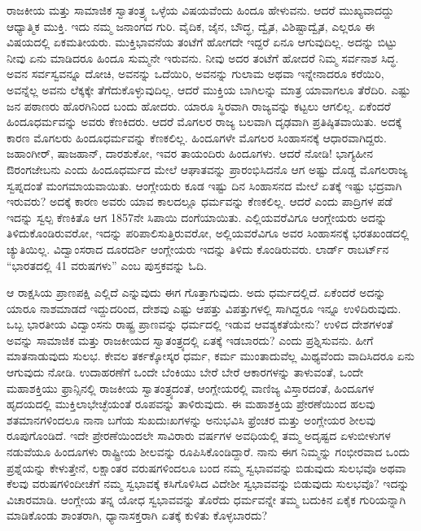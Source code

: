ರಾಜಕೀಯ ಮತ್ತು ಸಾಮಾಜಿಕ ಸ್ವಾತಂತ್ರ್ಯ ಒಳ್ಳೆಯ ವಿಷಯವೆಂದು ಹಿಂದೂ ಹೇಳುವನು. ಆದರೆ ಮುಖ್ಯವಾದದ್ದು ಆಧ್ಯಾತ್ಮಿಕ ಮುಕ್ತಿ. ಇದು ನಮ್ಮ ಜನಾಂಗದ ಗುರಿ. ವೈದಿಕ, ಜೈನ, ಬೌದ್ಧ, ದ್ವೈತ, ವಿಶಿಷ್ಟಾದ್ವೈತ, ಎಲ್ಲರೂ ಈ ವಿಷಯದಲ್ಲಿ ಏಕಮತೀಯರು.\- ಮುಕ್ತಿಭಾವನೆಯ ತಂಟೆಗೆ ಹೋಗದೇ ಇದ್ದರೆ ಏನೂ ಆಗುವುದಿಲ್ಲ. ಅದನ್ನು ಬಿಟ್ಟು ನೀವು ಏನು ಮಾಡಿದರೂ ಹಿಂದೂ ಸುಮ್ಮನೇ ಇರುವನು. ನೀವು ಅದರ ತಂಟೆಗೆ ಹೋದರೆ ನಿಮ್ಮ ಸರ್ವನಾಶ ಸಿದ್ಧ. ಅವನ ಸರ್ವಸ್ವವನ್ನೂ ದೋಚಿ, ಅವನನ್ನು ಒದೆಯಿರಿ, ಅವನನ್ನು ಗುಲಾಮ ಅಥವಾ ಇನ್ನೇನಾದರೂ ಕರೆಯಿರಿ, ಅವನ್ನೆಲ್ಲ ಅವನು ಲೆಕ್ಕಕ್ಕೇ ತೆಗೆದುಕೊಳ್ಳುವುದಿಲ್ಲ. ಆದರೆ ಮುಕ್ತಿಯ ಬಾಗಿಲನ್ನು ಮಾತ್ರ ಯಾವಾಗಲೂ ತೆರೆದಿರಿ. ಎಷ್ಟು ಜನ ಪಠಾಣರು ಹೊರಗಿನಿಂದ ಬಂದು ಹೋದರು. ಯಾರೂ ಸ್ಥಿರವಾಗಿ ರಾಜ್ಯವನ್ನು ಕಟ್ಟಲು ಆಗಲಿಲ್ಲ. ಏಕೆಂದರೆ ಹಿಂದೂಧರ್ಮವನ್ನು ಅವರು ಕೆಣಕಿದರು. ಆದರೆ ಮೊಗಲರ ರಾಜ್ಯ ಬಲವಾಗಿ ದೃಢವಾಗಿ ಪ್ರತಿಷ್ಠಿತವಾಯಿತು. ಅದಕ್ಕೆ ಕಾರಣ ಮೊಗಲರು ಹಿಂದೂಧರ್ಮವನ್ನು ಕೆಣಕಲಿಲ್ಲ. ಹಿಂದೂಗಳೇ ಮೊಗಲರ ಸಿಂಹಾಸನಕ್ಕೆ ಆಧಾರವಾಗಿದ್ದರು. ಜಹಾಂಗೀರ್​, ಷಾಜಹಾನ್​, ದಾರಶುಕೋ, ಇವರ ತಾಯಂದಿರು ಹಿಂದೂಗಳು. ಆದರೆ ನೋಡಿ! ಭಾಗ್ಯಹೀನ ಔರಂಗಜೇಬನು ಎಂದು ಹಿಂದೂಧರ್ಮದ ಮೇಲೆ ಆಘಾತವನ್ನು ಪ್ರಾರಂಭಿಸಿದನೊ ಆಗ ಅಷ್ಟು ದೊಡ್ಡ ಮೊಗಲರಾಜ್ಯ ಸ್ವಪ್ನದಂತೆ ಮಂಗಮಾಯವಾಯಿತು. ಆಂಗ್ಲೇಯರು ಕೂಡ ಇಷ್ಟು ದಿನ ಸಿಂಹಾಸನದ ಮೇಲೆ ಏತಕ್ಕೆ ಇಷ್ಟು ಭದ್ರವಾಗಿ ಇರುವರು? ಅದಕ್ಕೆ ಕಾರಣ ಅವರು ಯಾವ ಕಾಲದಲ್ಲೂ ಧರ್ಮವನ್ನು ಕೆಣಕಲಿಲ್ಲ. ಆದರೆ ಎಂದು ಪಾದ್ರಿಗಳ ಪಡೆ ಇದನ್ನು ಸ್ವಲ್ಪ ಕೆಣಕಿತೊ ಆಗ 1857ನೇ ಸಿಪಾಯಿ ದಂಗೆಯಾಯಿತು. ಎಲ್ಲಿಯವರೆವಿಗೂ ಆಂಗ್ಲೇಯರು ಅದನ್ನು ತಿಳಿದುಕೊಂಡಿರುವರೋ, ಇದನ್ನು ಪರಿಪಾಲಿಸುತ್ತಿರುವರೋ, ಅಲ್ಲಿಯವರೆವಿಗೂ ಅವರ ಸಿಂಹಾಸನಕ್ಕೆ ಭರತಖಂಡದಲ್ಲಿ ಚ್ಯುತಿಯಿಲ್ಲ. ವಿದ್ವಾಂಸರಾದ ದೂರದರ್ಶಿ ಆಂಗ್ಲೇಯರು ಇದನ್ನು ತಿಳಿದು ಕೊಂಡಿರುವರು. ಲಾರ್ಡ್​ ರಾಬರ್ಟ್​ನ “ಭಾರತದಲ್ಲಿ 41 ವರುಷಗಳು” ಎಂಬ ಪುಸ್ತಕವನ್ನು ಓದಿ.

ಆ ರಾಕ್ಷಸಿಯ ಪ್ರಾಣಪಕ್ಷಿ ಎಲ್ಲಿದೆ ಎನ್ನುವುದು ಈಗ ಗೊತ್ತಾಗುವುದು. ಅದು ಧರ್ಮದಲ್ಲಿದೆ. ಏಕೆಂದರೆ ಅದನ್ನು ಯಾರೂ ನಾಶಮಾಡದೆ ಇದ್ದುದರಿಂದ, ದೇಶವು ಎಷ್ಟು ಆಪತ್ತು ವಿಪತ್ತುಗಳಲ್ಲಿ ಸಾಗಿದ್ದರೂ ಇನ್ನೂ ಉಳಿದಿರುವುದು. ಒಬ್ಬ ಭಾರತೀಯ ವಿದ್ವಾಂಸನು ರಾಷ್ಟ್ರ ಪ್ರಾಣವನ್ನು ಧರ್ಮದಲ್ಲಿ ಇಡುವ ಆವಶ್ಯಕತೆಯೇನು? ಉಳಿದ ದೇಶಗಳಂತೆ ಅವನ್ನು ಸಾಮಾಜಿಕ ಮತ್ತು ರಾಜಕೀಯದ ಸ್ವಾತಂತ್ರ್ಯದಲ್ಲಿ ಏತಕ್ಕೆ ಇಡಬಾರದು? ಎಂದು ಪ್ರಶ್ನಿಸುವನು. ಹೀಗೆ ಮಾತನಾಡುವುದು ಸುಲಭ. ಕೇವಲ ತರ್ಕಕ್ಕೋಸ್ಕರ ಧರ್ಮ, ಕರ್ಮ ಮುಂತಾದುವೆಲ್ಲ ಮಿಥ್ಯವೆಂದು ವಾದಿಸಿದರೂ ಏನು ಆಗುವುದು ನೋಡಿ. ಉದಾಹರಣೆಗೆ ಒಂದೇ ಬೆಂಕಿಯು ಬೇರೆ ಬೇರೆ ಆಕಾರಗಳನ್ನು ತಾಳುವಂತೆ, ಒಂದೇ ಮಹಾಶಕ್ತಿಯು ಫ್ರಾನ್ಸಿನಲ್ಲಿ ರಾಜಕೀಯ ಸ್ವಾತಂತ್ರ್ಯದಂತೆ, ಆಂಗ್ಲೇಯರಲ್ಲಿ ವಾಣಿಜ್ಯ ವಿಸ್ತಾರದಂತೆ, ಹಿಂದೂಗಳ ಹೃದಯದಲ್ಲಿ ಮುಕ್ತಿಲಾಭೇಚ್ಛೆಯಂತೆ ರೂಪವನ್ನು ತಾಳಿರುವುದು. ಈ ಮಹಾಶಕ್ತಿಯ ಪ್ರೇರಣೆಯಿಂದ ಹಲವು ಶತಮಾನಗಳಿಂದಲೂ ನಾನಾ ಬಗೆಯ ಸುಖದುಃಖಗಳನ್ನು ಅನುಭವಿಸಿ ಫ್ರೆಂಚರ ಮತ್ತು ಅಂಗ್ಲೇಯರ ಶೀಲವು ರೂಪುಗೊಂಡಿದೆ. ಇದೇ ಪ್ರೇರಣೆ\-ಯಿಂದಲೇ ಸಾವಿರಾರು ವರ್ಷಗಳ ಅವಧಿಯಲ್ಲಿ ತಮ್ಮ ಅದೃಷ್ಟದ ಏಳು\-ಬೀಳುಗಳ ನಡುವೆಯೂ ಹಿಂದೂಗಳು ರಾಷ್ಟ್ರೀಯ ಶೀಲವನ್ನು ರೂಪಿಸಿಕೊಂಡಿದ್ದಾರೆ. ನಾನು ಈಗ ನಿಮ್ಮನ್ನು ಗಂಭೀರವಾದ ಒಂದು ಪ್ರಶ್ನೆಯನ್ನು ಕೇಳುತ್ತೇನೆ, ಲಕ್ಷಾಂತರ ವರುಷಗಳಿಂದಲೂ ಬಂದ ನಮ್ಮ ಸ್ವಭಾವವನ್ನು ಬಿಡುವುದು ಸುಲಭವೊ ಅಥವಾ ಕೆಲವು ವರುಷಗಳಿಂದೀಚೆಗೆ ನಮ್ಮ ಸ್ವಭಾವಕ್ಕೆ ಕಸಿಗೊಳಿಸಿದ ವಿದೇಶೀ ಸ್ವಭಾವವನ್ನು ಬಿಡುವುದು ಸುಲಭವೊ? ಇದನ್ನು ವಿಚಾರಮಾಡಿ. ಆಂಗ್ಲೇಯ ತನ್ನ ಯೋಧ ಸ್ವಭಾವವನ್ನು ತೊರೆದು ಧರ್ಮವನ್ನೇ ತಮ್ಮ ಬದುಕಿನ ಏಕೈಕ ಗುರಿಯನ್ನಾಗಿ ಮಾಡಿಕೊಂಡು ಶಾಂತರಾಗಿ, ಧ್ಯಾನಾಸಕ್ತರಾಗಿ ಏತಕ್ಕೆ ಕುಳಿತು ಕೊಳ್ಳಬಾರದು?

